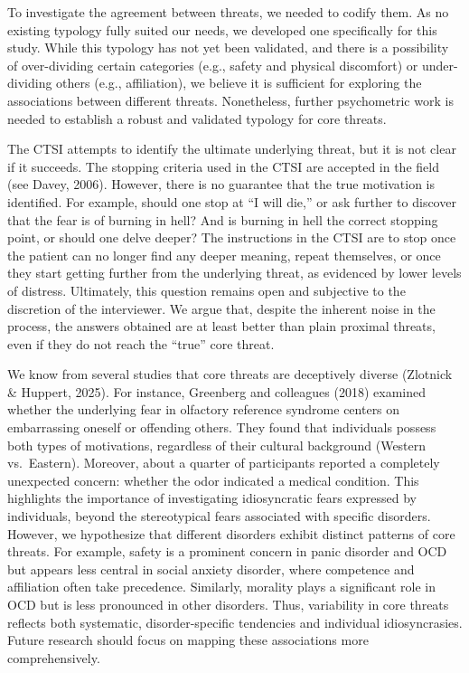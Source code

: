 \documentclass[
  man,floatsintext]{apa7}
\begin{document}
To investigate the agreement between threats, we needed to codify them.
As no existing typology fully suited our needs, we developed one specifically for this study.
While this typology has not yet been validated, and there is a possibility of over-dividing certain categories (e.g., safety and physical discomfort) or under-dividing others (e.g., affiliation), we believe it is sufficient for exploring the associations between different threats.
Nonetheless, further psychometric work is needed to establish a robust and validated typology for core threats.

The CTSI attempts to identify the ultimate underlying threat, but it is not clear if it succeeds.
The stopping criteria used in the CTSI are accepted in the field (see Davey, 2006).
However, there is no guarantee that the true motivation is identified.
For example, should one stop at ``I will die,'' or ask further to discover that the fear is of burning in hell?
And is burning in hell the correct stopping point, or should one delve deeper?
The instructions in the CTSI are to stop once the patient can no longer find any deeper meaning, repeat themselves, or once they start getting further from the underlying threat, as evidenced by lower levels of distress.
Ultimately, this question remains open and subjective to the discretion of the interviewer.
We argue that, despite the inherent noise in the process, the answers obtained are at least better than plain proximal threats, even if they do not reach the ``true'' core threat.

We know from several studies that core threats are deceptively diverse (Zlotnick \& Huppert, 2025).
For instance, Greenberg and colleagues (2018) examined whether the underlying fear in olfactory reference syndrome centers on embarrassing oneself or offending others.
They found that individuals possess both types of motivations, regardless of their cultural background (Western vs.~Eastern).
Moreover, about a quarter of participants reported a completely unexpected concern: whether the odor indicated a medical condition.
This highlights the importance of investigating idiosyncratic fears expressed by individuals, beyond the stereotypical fears associated with specific disorders.
However, we hypothesize that different disorders exhibit distinct patterns of core threats.
For example, safety is a prominent concern in panic disorder and OCD but appears less central in social anxiety disorder, where competence and affiliation often take precedence.
Similarly, morality plays a significant role in OCD but is less pronounced in other disorders.
Thus, variability in core threats reflects both systematic, disorder-specific tendencies and individual idiosyncrasies.
Future research should focus on mapping these associations more comprehensively.
\end{document}
